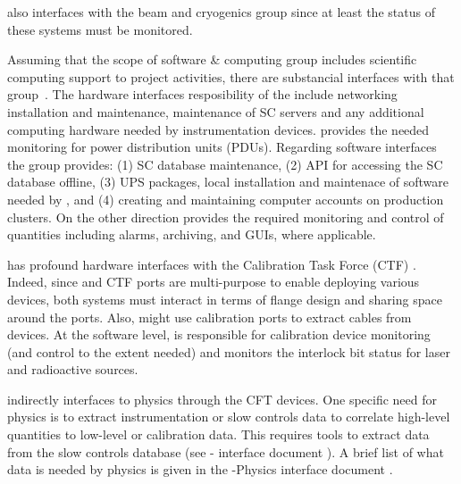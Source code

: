 
 also interfaces with the beam and cryogenics group since at least the status of these systems must be monitored.



Assuming that the scope of software \& computing  group includes scientific computing support to project activities, there are substancial interfaces with that group~\cite{bib:docdb7126}. 
The hardware interfaces resposibility of the  include networking installation and maintenance,
maintenance of SC servers 
and any additional computing hardware needed by instrumentation devices.
 provides the needed monitoring for power distribution units (PDUs). Regarding software interfaces the  group  provides:
(1) SC database maintenance, (2) API for accessing the SC database offline,
(3) UPS packages, local installation and maintenace of software needed by , and (4)  creating and maintaining computer accounts on production clusters. 
On the other direction    provides the required monitoring and control of  quantities including alarms, archiving, and GUIs, where applicable. 


 has profound  hardware interfaces with the Calibration Task Force (CTF) \cite{bib:docdb7072}. Indeed, since  and CTF ports are multi-purpose to enable deploying various devices,
both systems must interact in terms of flange design and sharing space around the ports. Also,  might use calibration ports to extract cables from  devices. 
At the software level,  is responsible for calibration device monitoring (and control to the extent needed) and 
monitors the interlock bit status for laser and radioactive sources. 

 indirectly interfaces to physics through the CFT devices. One specific need for physics is to extract
instrumentation or slow controls data to correlate high-level quantities to low-level or calibration data.
This requires tools to extract data from the slow controls database (see - interface document \cite{bib:docdb7126}).
A brief list of what  data is needed by physics is given in the -Physics interface document \cite{bib:docdb7099}. 

